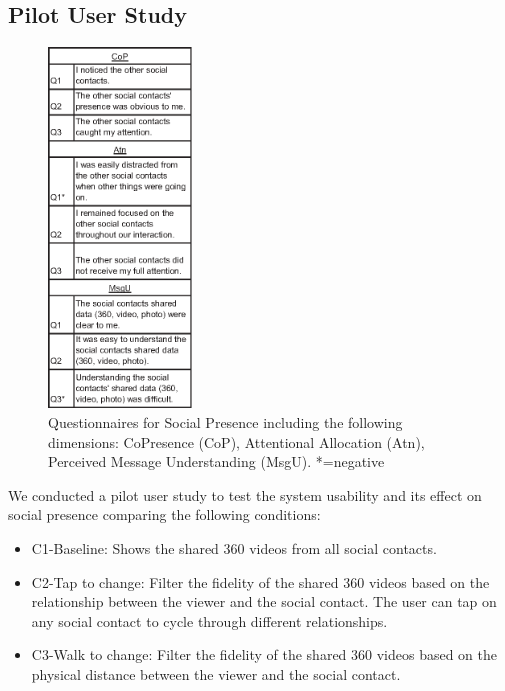 \subsection{Pilot User Study}

\begin{figure}[ht]
    \centering
    \includegraphics[width=1.5in]{images/chi/images-02.eps}
    \caption{Questionnaires for Social Presence including the following dimensions: CoPresence (CoP), Attentional Allocation (Atn), Perceived Message Understanding (MsgU). *=negative} 
      \label{tbl:questions}
\end{figure}

We conducted a pilot user study to test the system usability and its effect on social presence comparing the following conditions: 

\begin{itemize}
    \item C1-Baseline: Shows the shared 360 videos from all social contacts.
    \item C2-Tap to change: Filter the fidelity of the shared 360 videos based on the relationship between the viewer and the social contact. The user can tap on any social contact to cycle through different relationships.
    \item C3-Walk to change: Filter the fidelity of the shared 360 videos based on the physical distance between the viewer and the social contact.
\end{itemize}

